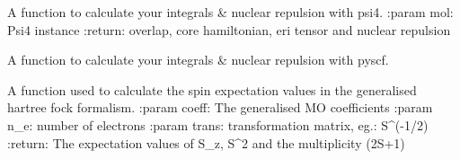 \documentclass[letterpaper,10pt,english]{sphinxmanual}
\begin{document}

\begin{fulllineitems}
\label{\detokenize{SCF_functions:hf.SCF_functions.get_integrals_psi4}}
A function to calculate your integrals \& nuclear repulsion with psi4.
:param mol: Psi4 instance
:return: overlap, core hamiltonian, eri tensor and nuclear repulsion

\end{fulllineitems}


\begin{fulllineitems}
\label{\detokenize{SCF_functions:hf.SCF_functions.get_integrals_pyscf}}
A function to calculate your integrals \& nuclear repulsion with pyscf.

\end{fulllineitems}


\begin{fulllineitems}
\label{\detokenize{SCF_functions:hf.SCF_functions.ghf_spin}}
A function used to calculate the spin expectation values in the generalised hartree fock formalism.
:param coeff: The generalised MO coefficients
:param n\_e: number of electrons
:param trans: transformation matrix, eg.: S\textasciicircum{}(-1/2)
:return: The expectation values of S\_z, S\textasciicircum{}2 and the multiplicity (2S+1)

\end{fulllineitems}

\end{document}
